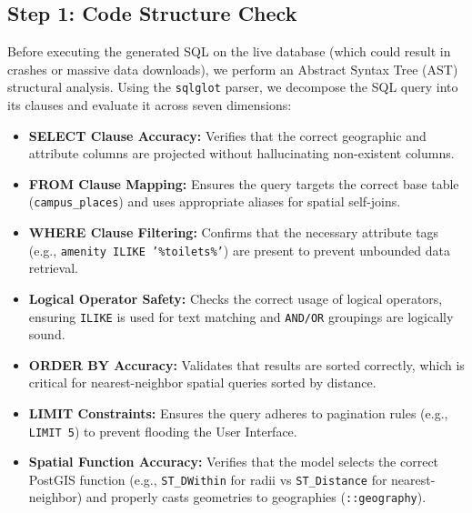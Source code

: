 \documentclass[11pt,a4paper]{article}
\begin{document}
\subsection{Step 1: Code Structure Check}
Before executing the generated SQL on the live database (which could result in crashes or massive data downloads), we perform an Abstract Syntax Tree (AST) structural analysis. Using the \texttt{sqlglot} parser, we decompose the SQL query into its clauses and evaluate it across seven dimensions:
\begin{itemize}
    \item \textbf{SELECT Clause Accuracy:} Verifies that the correct geographic and attribute columns are projected without hallucinating non-existent columns.
    \item \textbf{FROM Clause Mapping:} Ensures the query targets the correct base table (\texttt{campus\_places}) and uses appropriate aliases for spatial self-joins.
    \item \textbf{WHERE Clause Filtering:} Confirms that the necessary attribute tags (e.g., \texttt{amenity ILIKE '\%toilets\%'}) are present to prevent unbounded data retrieval.
    \item \textbf{Logical Operator Safety:} Checks the correct usage of logical operators, ensuring \texttt{ILIKE} is used for text matching and \texttt{AND/OR} groupings are logically sound.
    \item \textbf{ORDER BY Accuracy:} Validates that results are sorted correctly, which is critical for nearest-neighbor spatial queries sorted by distance.
    \item \textbf{LIMIT Constraints:} Ensures the query adheres to pagination rules (e.g., \texttt{LIMIT 5}) to prevent flooding the User Interface.
    \item \textbf{Spatial Function Accuracy:} Verifies that the model selects the correct PostGIS function (e.g., \texttt{ST\_DWithin} for radii vs \texttt{ST\_Distance} for nearest-neighbor) and properly casts geometries to geographies (\texttt{::geography}).
\end{itemize}
\end{document}
